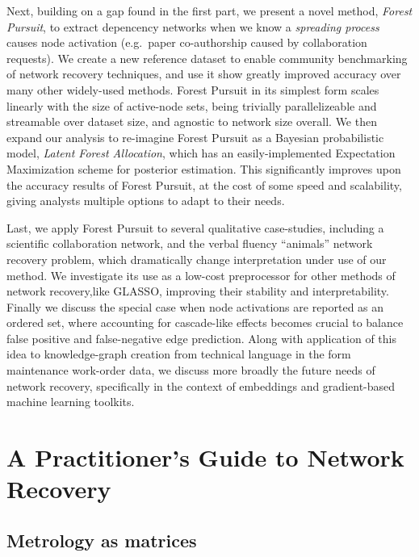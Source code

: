 \documentclass[%
	12pt,
		oneside,
		letterpaper
]{book}
\begin{document}
Next, building on a gap found in the first part, we present a novel
method, \emph{Forest Pursuit}, to extract depencency networks when we
know a \emph{spreading process} causes node activation (e.g.~paper
co-authorship caused by collaboration requests). We create a new
reference dataset to enable community benchmarking of network recovery
techniques, and use it show greatly improved accuracy over many other
widely-used methods. Forest Pursuit in its simplest form scales linearly
with the size of active-node sets, being trivially parallelizeable and
streamable over dataset size, and agnostic to network size overall. We
then expand our analysis to re-imagine Forest Pursuit as a Bayesian
probabilistic model, \emph{Latent Forest Allocation}, which has an
easily-implemented Expectation Maximization scheme for posterior
estimation. This significantly improves upon the accuracy results of
Forest Pursuit, at the cost of some speed and scalability, giving
analysts multiple options to adapt to their needs.

Last, we apply Forest Pursuit to several qualitative case-studies,
including a scientific collaboration network, and the verbal fluency
``animals'' network recovery problem, which dramatically change
interpretation under use of our method. We investigate its use as a
low-cost preprocessor for other methods of network recovery,like GLASSO,
improving their stability and interpretability. Finally we discuss the
special case when node activations are reported as an ordered set, where
accounting for cascade-like effects becomes crucial to balance false
positive and false-negative edge prediction. Along with application of
this idea to knowledge-graph creation from technical language in the
form maintenance work-order data, we discuss more broadly the future
needs of network recovery, specifically in the context of embeddings and
gradient-based machine learning toolkits.

\part{A Practitioner's Guide to Network Recovery}

\chapter{Metrology as matrices}\label{metrology-as-matrices}
\end{document}
